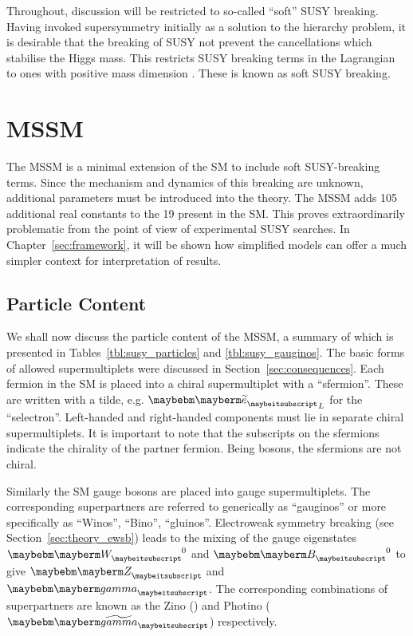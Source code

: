 Throughout, discussion will be restricted to so-called ``soft'' \ac{SUSY}
breaking. Having invoked supersymmetry initially as a solution to the hierarchy
problem, it is desirable that the breaking of \ac{SUSY} not prevent the
cancellations which stabilise the Higgs mass. This restricts \ac{SUSY} breaking
terms in the Lagrangian to ones with positive mass dimension
\cite{susy_primer}. These is known as soft \ac{SUSY} breaking.


\section{\acl{MSSM}}
The \acl{MSSM} is a minimal extension of the \ac{SM} to include soft
\ac{SUSY}-breaking terms. Since the mechanism and dynamics of this breaking are
unknown, additional parameters must be introduced into the theory. The \ac{MSSM}
adds 105 additional real constants to the 19 present in the \ac{SM}. This proves
extraordinarily problematic from the point of view of experimental \ac{SUSY}
searches. In Chapter~\ref{sec:framework}, it will be shown how simplified models
can offer a much simpler context for interpretation of results.

\subsection{Particle Content}
We shall now discuss the particle content of the \ac{MSSM}, a summary of which
is presented in Tables~\ref{tbl:susy_particles} and \ref{tbl:susy_gauginos}. The
basic forms of allowed supermultiplets were discussed in
Section~\ref{sec:consequences}. Each fermion in the \ac{SM} is placed into a
chiral supermultiplet with a \spinzero ``sfermion''. These are written with a
tilde, e.g. $\PSe_L$ for the ``selectron''. Left-handed and right-handed
components must lie in separate chiral supermultiplets. It is important to note
that the subscripts on the sfermions indicate the chirality of the partner
fermion. Being \spinzero bosons, the sfermions are not chiral.

Similarly the \ac{SM} gauge bosons are placed into gauge supermultiplets. The
corresponding superpartners are referred to generically as ``gauginos'' or more
specifically as ``Winos'', ``Bino'', ``gluinos''. Electroweak symmetry breaking
(see Section~\ref{sec:theory_ewsb}) leads to the mixing of the gauge eigenstates
$\PW^0$ and $\PB^0$ to give $\PZ$ and $\Pphoton$. The corresponding combinations
of superpartners are known as the Zino (\PSZ) and Photino ($\PSphotino$)
respectively.

